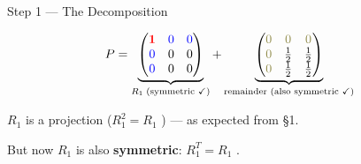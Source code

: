 \documentclass[10pt]{beamer}
\theoremstyle{definition}
\newcommand{\x}[1]{\alert{\textbf{#1}}}
\newcommand{\pvt}[1]{{\color{red}\mathbf{#1}}}       %
\newcommand{\crs}[1]{{\color{blue}#1}}                %
\newcommand{\ghost}[1]{{\color{yellow!50!black}#1}}   %
\begin{document}
\begin{frame}{Step 1 --- The Decomposition}

$$P = \underbrace{\begin{pmatrix} \pvt{1} & \crs{0} & \crs{0} \\ \crs{0} & 0 & 0 \\ \crs{0} & 0 & 0 \end{pmatrix}}_{R_1 \;\text{(symmetric } \checkmark\text{)}} + \underbrace{\begin{pmatrix} \ghost{0} & \ghost{0} & \ghost{0} \\ \ghost{0} & \frac{1}{2} & \frac{1}{2} \\ \ghost{0} & \frac{1}{2} & \frac{1}{2} \end{pmatrix}}_{\text{remainder (also symmetric } \checkmark\text{)}}$$

\vspace{0.5em}

$R_1$ is a projection ($R_1^2 = R_1$ \checkmark) --- as expected from \S1.

\vspace{0.3em}

But now $R_1$ is also \x{symmetric}: $R_1^T = R_1$ \checkmark.

\end{frame}
\end{document}

